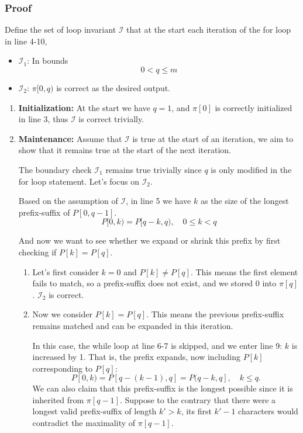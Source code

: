\documentclass[12pt]{article}
\begin{document}
\subsubsection*{Proof}

Define the set of loop invariant \(\mathcal{I}\) that at the start each iteration of the for loop in line 4-10,
\begin{itemize}
    \item \(\mathcal{I}_1\): In bounds
    \[
        0 < q \leq m
    \]
    \item \(\mathcal{I}_2\): \(\pi[0, q)\) is correct as the desired output.
\end{itemize}

\begin{enumerate}
    \item \textbf{Initialization:} At the start we have \(q = 1\), and \(\pi[0]\) is correctly initialized in line 3, thus \(\mathcal{I}\) is correct trivially.
    
    \item \textbf{Maintenance:} Assume that \(\mathcal{I}\) is true at the start of an iteration, we aim to show that it remains true at the start of the next iteration.

    The boundary check \(\mathcal{I}_1\) remains true trivially since \(q\) is only modified in the for loop statement. Let's focus on \(\mathcal{I}_2\).

    Based on the assumption of \(\mathcal{I}\), in line 5 we have \(k\) as the size of the longest prefix-suffix of \(P[0, q-1]\).
    \begin{equation} %
        P[0, k) = P[q-k, q), \quad 0 \leq k < q
    \end{equation}

    And now we want to see whether we expand or shrink this prefix by first checking if \(P[k] = P[q]\).
    
    \begin{enumerate}
        \item Let's first consider \(k = 0\) and \(P[k] \neq P[q]\). This means the first element fails to match, so a prefix-suffix does not exist, and we stored 0 into \(\pi[q]\). \(\mathcal{I}_2\) is correct.

        \item Now we consider \(P[k] = P[q]\). This means the previous prefix-suffix remains matched and can be expanded in this iteration.
        
        In this case, the while loop at line 6-7 is skipped, and we enter line 9: \(k\) is increased by 1. That is, the prefix expands, now including \(P[k]\) corresponding to \(P[q]\):
        \[
            P[0, k) = P[q-(k-1), q] = P(q-k, q], \quad k \leq q.
        \]
        We can also claim that this prefix-suffix is the longest possible since it is inherited from \(\pi[q-1]\). Suppose to the contrary that there were a longest valid prefix-suffix of length \(k' > k\), its first \(k'-1\) characters would contradict the maximality of \(\pi[q-1]\).


\end{enumerate}
\end{enumerate}
\end{document}
